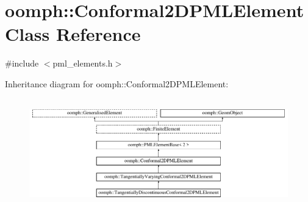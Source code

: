 \hypertarget{classoomph_1_1Conformal2DPMLElement}{}\section{oomph\+:\+:Conformal2\+D\+P\+M\+L\+Element Class Reference}
\label{classoomph_1_1Conformal2DPMLElement}


{\ttfamily \#include $<$pml\+\_\+elements.\+h$>$}

Inheritance diagram for oomph\+:\+:Conformal2\+D\+P\+M\+L\+Element\+:\begin{figure}[H]
\begin{center}
\leavevmode
\includegraphics[height=4.745763cm]{classoomph_1_1Conformal2DPMLElement}
\end{center}
\end{figure}
